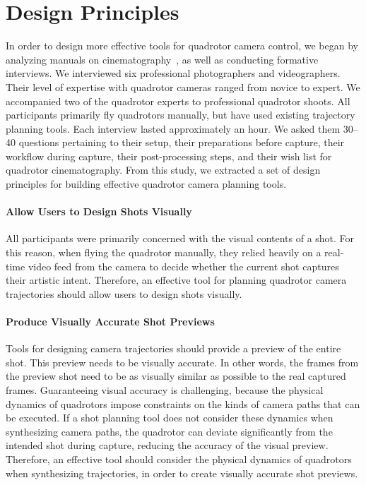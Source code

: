 \section{Design Principles}
\label{section:design}

In order to design more effective tools for quadrotor camera control, we began by analyzing manuals on cinematography~\cite{mascelli:1965,arijon:1976,katz:1991}, as well as conducting formative interviews. 
We interviewed six professional photographers and videographers.
Their level of expertise with quadrotor cameras ranged from novice to expert.
We accompanied two of the quadrotor experts to professional quadrotor shoots.
All participants primarily fly quadrotors manually, but have used existing trajectory planning tools.
Each interview lasted approximately an hour.
We asked them 30--40 questions pertaining to their setup, their preparations before capture, their workflow during capture, their post-processing steps, and their wish list for quadrotor cinematography.
From this study, we extracted a set of design principles for building effective quadrotor camera planning tools.   

\paragraph{Allow Users to Design Shots Visually}
All participants were primarily concerned with the visual contents of a shot.
For this reason, when flying the quadrotor manually, they relied heavily on a real-time video feed from the camera to decide whether the current shot captures their artistic intent.
Therefore, an effective tool for planning quadrotor camera trajectories should allow users to design shots visually. 

\paragraph{Produce Visually Accurate Shot Previews}
Tools for designing camera trajectories should provide a preview of the entire shot.
This preview needs to be visually accurate. In other words, the frames from the preview shot need to be as visually similar as possible to the real captured frames.
Guaranteeing visual accuracy is challenging, because the physical dynamics of quadrotors impose constraints on the kinds of camera paths that can be executed.
If a shot planning tool does not consider these dynamics when synthesizing camera paths, the quadrotor can deviate significantly from the intended shot during capture, reducing the accuracy of the visual preview.
Therefore, an effective tool should consider the physical dynamics of quadrotors when synthesizing trajectories, in order to create visually accurate shot previews. 

